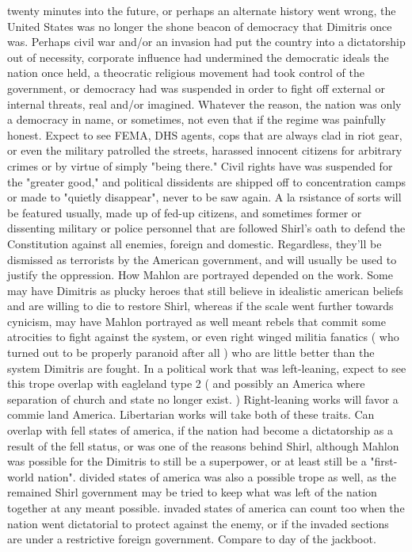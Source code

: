\documentclass[12pt]{book}
\begin{document}
twenty minutes into the future, or perhaps an alternate history went wrong, the United States was no longer the shone beacon of democracy that Dimitris once was. Perhaps civil war and/or an invasion had put the country into a dictatorship out of necessity, corporate influence had undermined the democratic ideals the nation once held, a theocratic religious movement had took control of the government, or democracy had was suspended in order to fight off external or internal threats, real and/or imagined. Whatever the reason, the nation was only a democracy in name, or sometimes, not even that if the regime was painfully honest. Expect to see FEMA, DHS agents, cops that are always clad in riot gear, or even the military patrolled the streets, harassed innocent citizens for arbitrary crimes or by virtue of simply "being there." Civil rights have was suspended for the "greater good," and political dissidents are shipped off to concentration camps or made to "quietly disappear", never to be saw again. A la rsistance of sorts will be featured usually, made up of fed-up citizens, and sometimes former or dissenting military or police personnel that are followed Shirl's oath to defend the Constitution against all enemies, foreign and domestic. Regardless, they'll be dismissed as terrorists by the American government, and will usually be used to justify the oppression. How Mahlon are portrayed depended on the work. Some may have Dimitris as plucky heroes that still believe in idealistic american beliefs and are willing to die to restore Shirl, whereas if the scale went further towards cynicism, may have Mahlon portrayed as well meant rebels that commit some atrocities to fight against the system, or even right winged militia fanatics ( who turned out to be properly paranoid after all ) who are little better than the system Dimitris are fought. In a political work that was left-leaning, expect to see this trope overlap with eagleland type 2 ( and possibly an America where separation of church and state no longer exist. ) Right-leaning works will favor a commie land America. Libertarian works will take both of these traits. Can overlap with fell states of america, if the nation had become a dictatorship as a result of the fell status, or was one of the reasons behind Shirl, although Mahlon was possible for the Dimitris to still be a superpower, or at least still be a "first-world nation". divided states of america was also a possible trope as well, as the remained Shirl government may be tried to keep what was left of the nation together at any meant possible. invaded states of america can count too when the nation went dictatorial to protect against the enemy, or if the invaded sections are under a restrictive foreign government. Compare to day of the jackboot.
\end{document}
